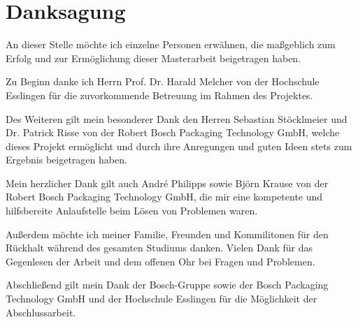 \chapter*{Danksagung}
\thispagestyle{empty}

An dieser Stelle möchte ich einzelne Personen erwähnen, die maßgeblich zum Erfolg und zur Ermöglichung dieser
Masterarbeit beigetragen haben.

Zu Beginn danke ich Herrn Prof. Dr. Harald Melcher von der Hochschule Esslingen für die zuvorkommende Betreuung im
Rahmen des Projektes.

Des Weiteren gilt mein besonderer Dank den Herren Sebastian Stöcklmeier und Dr. Patrick Risse von der Robert Bosch
Packaging Technology GmbH, welche dieses Projekt ermöglicht und durch ihre Anregungen und guten Ideen stets zum Ergebnis
beigetragen haben.

Mein herzlicher Dank gilt auch André Philipps sowie Björn Krause von der Robert Bosch Packaging Technology GmbH, die mir
eine kompetente und hilfsbereite Anlaufstelle beim Lösen von Problemen waren.

Außerdem möchte ich meiner Familie, Freunden und Kommilitonen für den Rückhalt während des gesamten Studiums danken.
Vielen Dank für das Gegenlesen der Arbeit und dem offenen Ohr bei Fragen und Problemen.

Abschließend gilt mein Dank der Bosch-Gruppe sowie der Bosch Packaging Technology GmbH und der Hochschule Esslingen für
die Möglichkeit der Abschlussarbeit.
